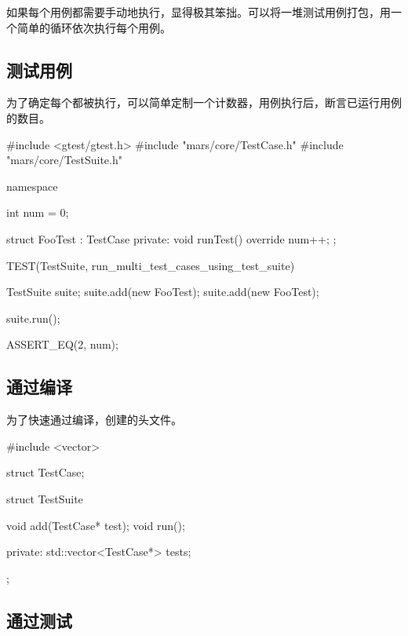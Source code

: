 \begin{content}

如果每个用例都需要手动地执行，显得极其笨拙。可以将一堆测试用例打包，用一个简单的循环依次执行每个用例。

\subsection{测试用例}

为了确定每个都被执行，可以简单定制一个计数器，用例执行后，断言已运行用例的数目。

\begin{leftbar}
 \begin{c++}[caption={\ttfamily{test/mars/core/TestSuiteSpec.cc}}]
#include <gtest/gtest.h>
#include "mars/core/TestCase.h"
#include "mars/core/TestSuite.h"

namespace {
  int num = 0;

  struct FooTest : TestCase {
  private:
    void runTest() override {
      num++;
    }
  };
}

TEST(TestSuite, run_multi_test_cases_using_test_suite) {
  TestSuite suite;
  suite.add(new FooTest);
  suite.add(new FooTest);

  suite.run();

  ASSERT_EQ(2, num);
}
 \end{c++}
\end{leftbar}

\subsection{通过编译}

为了快速通过编译，创建的头文件。

\begin{leftbar}
 \begin{c++}[caption={\ttfamily{include/mars/core/TestSuite.h}}]
#include <vector>

struct TestCase;

struct TestSuite {
  void add(TestCase* test);
  void run();

private:
  std::vector<TestCase*> tests;
};
 \end{c++}
\end{leftbar}

\subsection{通过测试}


\end{content}
